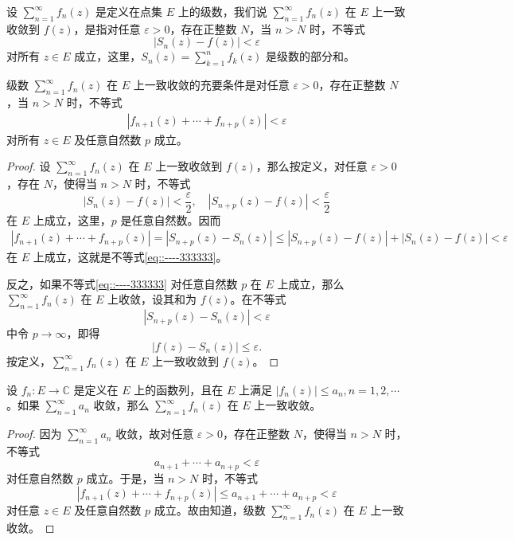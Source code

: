 \documentclass[../../main.tex]{subfiles}
\begin{document}
\begin{definition}
设 \( \sum_{n=1}^{\infty} f_n(z) \) 是定义在点集 \( E \) 上的级数，我们说 \( \sum_{n=1}^{\infty} f_n(z) \) 在 \( E \) 上一致收敛到 \( f(z) \)，是指对任意 \( \varepsilon > 0 \)，存在正整数 \( N \)，当 \( n > N \) 时，不等式
\[
|S_n(z) - f(z)| < \varepsilon
\]
对所有 \( z \in E \) 成立，这里，\( S_n(z) = \sum_{k=1}^{n} f_k(z) \) 是级数的部分和。
\end{definition}

\begin{theorem}\label{theorem:定理4.1.2}
级数 \( \sum_{n=1}^{\infty} f_n(z) \) 在 \( E \) 上一致收敛的充要条件是对任意 \( \varepsilon > 0 \)，存在正整数 \( N \)，当 \( n > N \) 时，不等式
\begin{align}
|f_{n + 1}(z) + \cdots + f_{n + p}(z)| < \varepsilon\label{eq::----333333}
\end{align}
对所有 \( z \in E \) 及任意自然数 \( p \) 成立。
\end{theorem}
\begin{proof}
设 \( \sum_{n=1}^{\infty} f_n(z) \) 在 \( E \) 上一致收敛到 \( f(z) \)，那么按定义，对任意 \( \varepsilon > 0 \)，存在 \( N \)，使得当 \( n > N \) 时，不等式
\[
|S_n(z) - f(z)| < \frac{\varepsilon}{2},
\quad
|S_{n + p}(z) - f(z)| < \frac{\varepsilon}{2}
\]
在 \( E \) 上成立，这里，\( p \) 是任意自然数。因而
\begin{align*}
|f_{n + 1}(z) + \cdots + f_{n + p}(z)| = |S_{n + p}(z) - S_n(z)| \leqslant |S_{n + p}(z) - f(z)| + |S_n(z) - f(z)| < \varepsilon
\end{align*}
在 \( E \) 上成立，这就是不等式\eqref{eq::----333333}。

反之，如果不等式\eqref{eq::----333333} 对任意自然数 \( p \) 在 \( E \) 上成立，那么 \( \sum_{n=1}^{\infty} f_n(z) \) 在 \( E \) 上收敛，设其和为 \( f(z) \)。在不等式
\[
|S_{n + p}(z) - S_n(z)| < \varepsilon
\]
中令 \( p \to \infty \)，即得
\[
|f(z) - S_n(z)| \leqslant \varepsilon.
\]
按定义，\( \sum_{n=1}^{\infty} f_n(z) \) 在 \( E \) 上一致收敛到 \( f(z) \)。
\end{proof}

\begin{theorem}[Weierstrass一致收敛判别法]\label{theorem:Weierstrass一致收敛判别法}
设 \( f_n: E \to \mathbb{C} \) 是定义在 \( E \) 上的函数列，且在 \( E \) 上满足 \( |f_n(z)| \leqslant a_n, n = 1, 2, \cdots \)。如果 \( \sum_{n=1}^{\infty} a_n \) 收敛，那么 \( \sum_{n=1}^{\infty} f_n(z) \) 在 \( E \) 上一致收敛。
\end{theorem}
\begin{proof}
因为 \( \sum_{n=1}^{\infty} a_n \) 收敛，故对任意 \( \varepsilon > 0 \)，存在正整数 \( N \)，使得当 \( n > N \) 时，不等式
\[
a_{n + 1} + \cdots + a_{n + p} < \varepsilon
\]
对任意自然数 \( p \) 成立。于是，当 \( n > N \) 时，不等式
\[
|f_{n + 1}(z) + \cdots + f_{n + p}(z)| \leqslant a_{n + 1} + \cdots + a_{n + p}
< \varepsilon
\]
对任意 \( z \in E \) 及任意自然数 \( p \) 成立。故由知道，级数 \( \sum_{n=1}^{\infty} f_n(z) \) 在 \( E \) 上一致收敛。
\end{proof}
\end{document}
